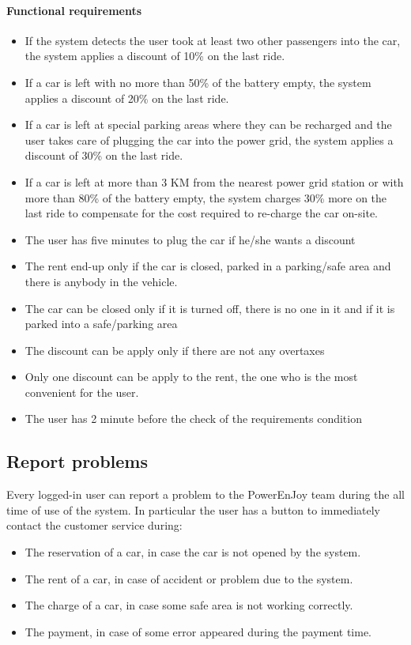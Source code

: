 \paragraph{Functional requirements }
\begin{itemize}
	\item If the system detects the user took at least two other passengers into the car, the system applies a discount of 10\% on the last ride.
	\item If a car is left with no more than 50\% of the battery empty, the system applies a discount of 20\% on the last ride.
	\item If a car is left at special parking areas where they can be recharged and the user takes care of plugging the car into the power grid, the system applies a discount of 30\% on the last ride.
	\item If a car is left at more than 3 KM from the nearest power grid station or with more than 80\% of the battery empty, the system charges 30\% more on the last ride to compensate for the cost required to re-charge the car on-site.
	\item The user has five minutes to plug the car if he/she wants a discount
	\item The rent end-up only if the car is closed, parked in a parking/safe area and there is anybody in the vehicle.
	\item The car can be closed only if it is turned off, there is no one in it and if it is parked into a safe/parking area
	\item The discount can be apply only if there are not any overtaxes
	\item Only one discount can be apply to the rent, the one who is the most convenient for the user.
	\item The user has 2 minute before the check of the requirements condition 
\end{itemize}

\subsection{Report problems}
Every logged-in user can report a problem to the PowerEnJoy team during the all time of use of the system. In particular the user has a button to immediately contact the customer service during:
\begin{itemize}
	\item The reservation of a car, in case the car is not opened by the system.
	\item The rent of a car, in case of accident or problem due to the system.
	\item The charge of a car, in case some safe area is not working correctly.
	\item The payment, in case of some error appeared during the payment time.
\end{itemize}
